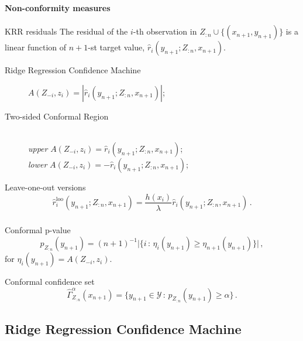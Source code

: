 \documentclass[t]{beamer}  %
\newcommand{\Ycal}{\mathcal{Y}}
\begin{document}
\begin{frame}[t]\frametitle{\insertsection}
  \framesubtitle{Non-conformity measures}
  \begin{block}{KRR residuals}  
    The residual of the $i$-th observation in $Z_{:n}\cup\{(x_{n+1}, y_{n+1})\}$
    is a linear function of $n+1$-st target value, $\hat{r}_i(y_{n+1}; Z_{:n}, x_{n+1})$.
  \end{block}

  \begin{description}
    \item[Ridge Regression Confidence Machine] $A(Z_{-i}, z_i) = |\hat{r}_i(y_{n+1}; Z_{:n}, x_{n+1})|$;
    \vspace{\baselineskip}
    \item[Two-sided Conformal Region] \hfill\\
      \textit{upper} $A(Z_{-i}, z_i) = \hat{r}_i(y_{n+1}; Z_{:n}, x_{n+1})$;\hfill\\
      \textit{lower} $A(Z_{-i}, z_i) = -\hat{r}_i(y_{n+1}; Z_{:n}, x_{n+1})$;
  \end{description}

  \begin{block}{Leave-one-out versions}
    $$ \hat{r}^{\text{loo}}_i(y_{n+1}; Z_{:n}, x_{n+1})
      = \frac{h(x_i)}{\lambda} \hat{r}_i(y_{n+1}; Z_{:n}, x_{n+1}) \,. $$
  \end{block}
\end{frame}

\begin{frame}[c]\frametitle{\insertsection}
  \begin{block}{Conformal p-value}
    $$ p_{Z_{:n}}(y_{n+1})
          = (n+1)^{-1} \bigl\lvert\{ i \,:\, \eta_i(y_{n+1}) \geq \eta_{n+1}(y_{n+1}) \}\bigr\rvert
      \,, $$
    for $\eta_i(y_{n+1}) = A(Z_{-i}, z_i)$.
  \end{block}
  \vspace{\baselineskip}
  \vspace{\baselineskip}
  \begin{block}{Conformal confidence set}
    $$ \hat{\Gamma}_{Z_{:n}}^\alpha(x_{n+1})
        = \bigl\{ y_{n+1}\in \Ycal \,:\, p_{Z_{:n}}(y_{n+1}) \geq \alpha \bigr\}
      \,. $$
  \end{block}
\end{frame}

\subsection{Ridge Regression Confidence Machine} %
\label{sub:ridge_regression_confidence_machine}
\end{document}
